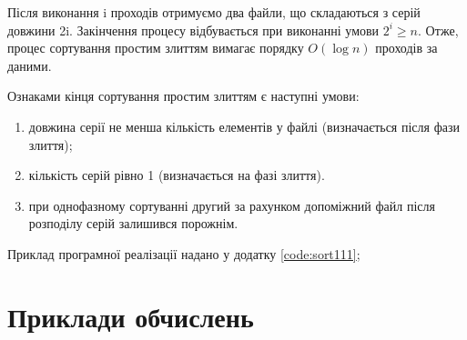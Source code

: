 Після виконання i проходів отримуємо два файли, що складаються з серій довжини 2i. Закінчення процесу відбувається при виконанні умови $2^i \geq n$. Отже, процес сортування простим злиттям вимагає порядку $O (\log n)$ проходів за даними.

Ознаками кінця сортування простим злиттям є наступні умови:

\begin{enumerate}
\item довжина серії не менша кількість елементів у файлі (визначається після фази злиття);
\item кількість серій рівно 1 (визначається на фазі злиття).
\item при однофазному сортуванні другий за рахунком допоміжний файл після розподілу серій залишився порожнім.
\end{enumerate}

Приклад програмної реалізації надано у додатку \ref{code:sort111};

\section{Приклади обчислень}
\nopagebreak[4]






